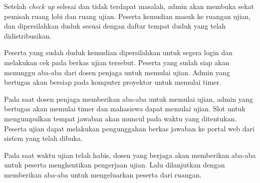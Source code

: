         Setelah \textit{check up} selesai dan tidak terdapat masalah, admin akan
        membuka sekat pemisah ruang lobi dan ruang ujian. Peserta kemudian masuk
        ke ruangan ujian, dan dipersilahkan duduk sesuai dengan daftar tempat
        duduk yang telah didistribusikan.
        
        Peserta yang sudah duduk kemudian dipersilahkan untuk segera login dan
        melakukan cek pada berkas ujian tersebut. Peserta yang sudah siap akan
        menunggu aba-aba dari dosen penjaga untuk memulai ujian. Admin yang
        bertugas akan bersiap pada komputer proyektor untuk memulai timer.
        
        Pada saat dosen penjaga memberikan aba-aba untuk memulai ujian, admin
        yang bertugas akan memulai timer dan mahasiswa dapat memulai ujian. Slot
        untuk mengumpulkan tempat jawaban akan muncul pada waktu yang
        ditentukan. Peserta ujian dapat melakukan pengunggahan berkas jawaban ke
        portal web dari sistem yang telah dibuka.
        
        Pada saat waktu ujian telah habis, dosen yang berjaga akan memberikan
        aba-aba untuk peserta menghentikan pengerjaan ujian. Lalu dilanjutkan
        dengan memberikan aba-aba untuk mengeluarkan peserta dari ruangan.
    
